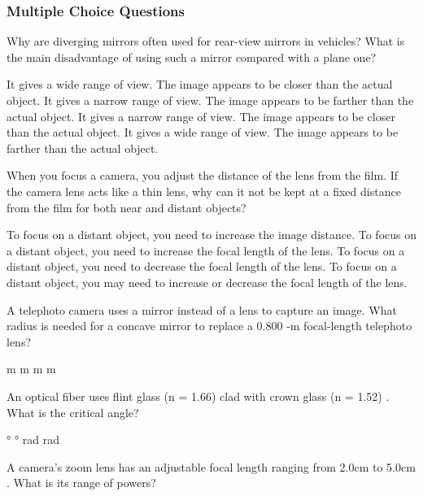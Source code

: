 \documentclass[12pt,addpoints]{exam}
\begin{document}
{{{				\subsubsection*{Multiple Choice Questions}
				\begin{questions}
					\question Why are diverging mirrors often used for rear-view mirrors in vehicles? What is the main disadvantage of using such a mirror compared with a plane one?
					\begin{choices}
						\choice It gives a wide range of view. The image appears to be closer than the actual object.
						\choice It gives a narrow range of view. The image appears to be farther than the actual object.
						\choice It gives a narrow range of view. The image appears to be closer than the actual object.
						\choice It gives a wide range of view. The image appears to be farther than the actual object.	
					\end{choices}
					\question When you focus a camera, you adjust the distance of the lens from the film. If the camera lens acts like a thin lens, why can it not be kept at a fixed distance from the film for both near and distant objects?
					\begin{choices}
						\choice To focus on a distant object, you need to increase the image distance.
						\choice To focus on a distant object, you need to increase the focal length of the lens.
						\choice To focus on a distant object, you need to decrease the focal length of the lens.
						\choice To focus on a distant object, you may need to increase or decrease the focal length of the lens.
					\end{choices}
					\question A telephoto camera uses a mirror instead of a lens to capture an image. What radius is needed for a concave mirror to replace a 0.800 -m focal-length telephoto lens? \\
					\begin{oneparchoices}
						 m
						 m
						 m
						 m
					\end{oneparchoices}
					\question An optical fiber uses flint glass (n = 1.66) clad with crown glass (n = 1.52) . What is the critical angle? \\
					\begin{oneparchoices}
						\choice 33.2°
						\choice 23.7°
						\choice 0.92 rad
						\choice 1.16 rad
					\end{oneparchoices}
					\question A camera’s zoom lens has an adjustable focal length ranging from 2.0cm to 5.0cm . What is its range of powers?\\

\end{questions}}}}
\end{document}
